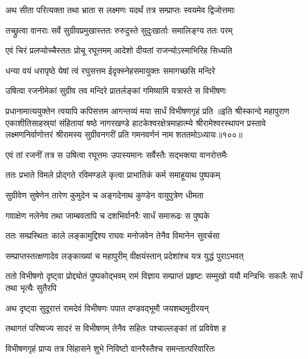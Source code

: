 \twolineshloka
{अथ सीता परित्यक्ता तथा भ्राता स लक्ष्मणः}
{यदर्थं तत्र सम्प्राप्तः स्वयमेव द्विजोत्तमाः}%

\twolineshloka
{तच्छ्रुत्वा वानराः सर्वे सुग्रीवप्रमुखास्ततः}
{रुरुदुस्ते सुदुःखार्ताः समालिङ्ग्य ततः परम्}%

\twolineshloka
{एवं चिरं प्रलप्योच्चैस्ततः प्रोचू रघूत्तमम्}
{आदेशो दीयतां राजन्योऽस्माभिरिह सिध्यति}%

\twolineshloka
{धन्या वयं धरापृष्ठे येषां त्वं रघुसत्तम}
{ईदृक्स्नेहसमायुक्तः समागच्छसि मन्दिरे}%


\twolineshloka
{उषित्वा रजनीमेकां सुग्रीव तव मन्दिरे} 
{प्रातर्लङ्कां गमिष्यामि यत्रास्ते स विभीषणः}%

\twolineshloka
{प्रधानामात्ययुक्तेन त्वयापि कपिसत्तम}
{आगन्तव्यं मया सार्धं विभीषणगृहं प्रति}%
॥इति श्रीस्कान्दे महापुराण एकाशीतिसाहस्र्यां संहितायां षष्ठे नागरखण्डे हाटकेश्वरक्षेत्रमाहात्म्ये श्रीरामेश्वरस्थापन प्रस्तावे लक्ष्मणनिर्वाणोत्तरं श्रीरामस्य सुग्रीवनगरीं प्रति गमनवर्णनं नाम शततमोऽध्यायः॥१००॥


\twolineshloka
{एवं तां रजनीं तत्र स उषित्वा रघूत्तमः}
{उपास्यमानः सर्वैस्तैः सद्भक्त्या वानरोत्तमैः}%

\twolineshloka
{ततः प्रभाते विमले प्रोद्गते रविमण्डले}
{कृत्वा प्राभातिकं कर्म समाहूयाथ पुष्पकम्}%

\twolineshloka
{सुग्रीवेण सुषेणेन तारेण कुमुदेन च}
{अङ्गदेनाथ कुण्डेन वायुपुत्रेण धीमता}%

\twolineshloka
{गवाक्षेण नलेनेव तथा जाम्बवतापि च}
{दशभिर्वानरैः सार्धं समारूढः स पुष्पके}%

\twolineshloka
{ततः सम्प्रस्थितः काले लङ्कामुद्दिश्य राघवः}
{मनोजवेन तेनैव विमानेन सुवर्चसा}%

\twolineshloka
{सम्प्राप्तस्तत्क्षणादेव लङ्काख्यां च महापुरीम्}
{वीक्षयंस्तान् प्रदेशांश्च यत्र युद्धं पुराऽभवत्}%

\threelineshloka
{ततो विभीषणो दृष्ट्वा प्रोद्द्योतं पुष्पकोद्भवम्}
{रामं विज्ञाय सम्प्राप्तं प्रहृष्टः सम्मुखो ययौ}
{मन्त्रिभिः सकलैः सार्धं तथा भृत्यैः सुतैरपि}%

\twolineshloka
{अथ दृष्ट्वा सुदूरात्तं रामदेवं विभीषणः}
{पपात दण्डवद्भूमौ जयशब्दमुदीरयन्}%

\twolineshloka
{तथागतं परिष्वज्य सादरं स विभीषणम्}
{तेनैव सहितः पश्चाल्लङ्कां तां प्रविवेश ह}%

\twolineshloka
{विभीषणगृहं प्राप्य तत्र सिंहासने शुभे}
{निविष्टो वानरैस्तैश्च समन्तात्परिवारितः}%

